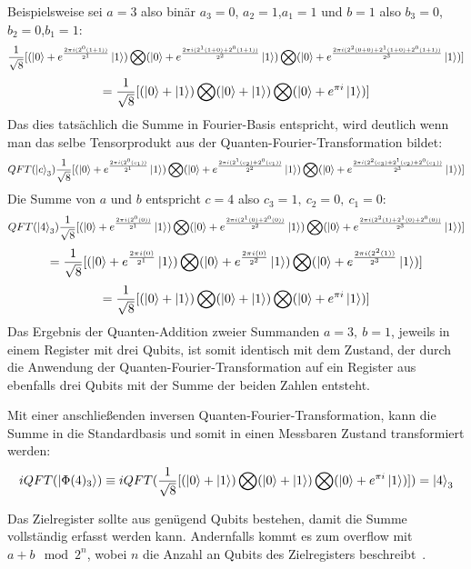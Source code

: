 Beispielsweise sei \(a = 3\) also binär \(a_3 = 0\), \(a_2 = 1\),\(a_1 = 1\) und 
\(b = 1\) also \(b_3 = 0\), \(b_2 = 0\),\(b_1 = 1\):
\[
\frac{1}{\sqrt{8}} [ (\ket{0} + { e^{\frac{2 \pi i (2^0(1+1))}{2^1}}}\ket{1} ) \operatorname{\bigotimes}
( \ket{0} + { e^{\frac{2 \pi i (2^1(1+0)+2^0(1+1))}{2^2}}}\ket{1} ) \operatorname{\bigotimes}
( \ket{0} + { e^{\frac{2 \pi i (2^{2}(0+0) +2^1(1+0)+2^0(1+1))}{2^3}}}\ket{1} ) ]
\]
\[
=\frac{1}{\sqrt{8}} [ (\ket{0} + \ket{1} ) \operatorname{\bigotimes}
( \ket{0} +   \ket{1} ) \operatorname{\bigotimes}
( \ket{0} +  e^{\pi i }\ket{1} ) ]
\]
Das dies tatsächlich die Summe in Fourier-Basis entspricht, 
wird deutlich wenn man das selbe Tensorprodukt aus der Quanten-Fourier-Transformation bildet:
\[
    QFT(\ket{c}_3)
    \frac{1}{\sqrt{8}} [ (\ket{0} + { e^{\frac{2 \pi i (2^0(c_1))}{2^1}}}\ket{1} ) \operatorname{\bigotimes}
( \ket{0} + { e^{\frac{2 \pi i (2^1(c_2)+2^0(c_1))}{2^2}}}\ket{1} ) \operatorname{\bigotimes}
( \ket{0} + { e^{\frac{2 \pi i (2^{2}(c_3) +2^1(c_2)+2^0(c_1))}{2^3}}}\ket{1} ) ]
\]
Die Summe von \(a\) und \(b\) entspricht \(c = 4\) also \(c_3 = 1,~c_2 = 0,~c_1=0\):
\[
    QFT(\ket{4}_3)
    \frac{1}{\sqrt{8}} [ (\ket{0} + { e^{\frac{2 \pi i (2^0(0))}{2^1}}}\ket{1} ) \operatorname{\bigotimes}
( \ket{0} + { e^{\frac{2 \pi i (2^1(0)+2^0(0))}{2^2}}}\ket{1} ) \operatorname{\bigotimes}
( \ket{0} + { e^{\frac{2 \pi i (2^{2}(1) +2^1(0)+2^0(0))}{2^3}}}\ket{1} ) ]
\]
\[
    = 
    \frac{1}{\sqrt{8}} [ (\ket{0} + { e^{\frac{2 \pi i (0)}{2^1}}}\ket{1} ) \operatorname{\bigotimes}
( \ket{0} + { e^{\frac{2 \pi i (0)}{2^2}}}\ket{1} ) \operatorname{\bigotimes}
( \ket{0} + { e^{\frac{2 \pi i (2^{2}(1))}{2^3}}}\ket{1} ) ]
\]
\[
=\frac{1}{\sqrt{8}} [ (\ket{0} + \ket{1} ) \operatorname{\bigotimes}
( \ket{0} +   \ket{1} ) \operatorname{\bigotimes}
( \ket{0} +  e^{\pi i }\ket{1} ) ]
\]
Das Ergebnis der Quanten-Addition zweier Summanden \(a=3,~b=1\), 
jeweils in einem Register mit drei Qubits,
ist somit identisch mit dem Zustand, 
der durch die Anwendung der Quanten-Fourier-Transformation auf ein Register 
aus ebenfalls drei Qubits mit der Summe der beiden Zahlen entsteht.

Mit einer anschließenden inversen Quanten-Fourier-Transformation, 
kann die Summe in die Standardbasis und somit in einen Messbaren Zustand transformiert werden:
\[
iQFT(\ket{\Phi(4)_3})
\equiv
 iQFT(\frac{1}{\sqrt{8}} [ (\ket{0} + \ket{1} ) \operatorname{\bigotimes}
( \ket{0} +   \ket{1} ) \operatorname{\bigotimes}
( \ket{0} +  e^{\pi i }\ket{1} ) ]) 
=
\ket{4}_3
\]

Das Zielregister sollte aus genügend Qubits bestehen, 
damit die Summe vollständig erfasst werden kann.
Andernfalls kommt es zum overflow mit \(a + b \mod 2^n\), 
wobei \(n\) die Anzahl an Qubits des Zielregisters beschreibt~\cite{beauregard2003circuit}.

